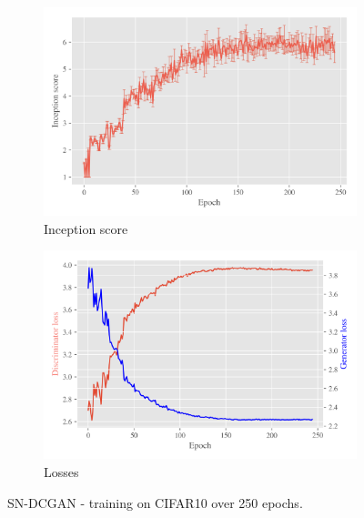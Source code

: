 \begin{figure}[H]
    \centering
    \begin{subfigure}[t]{0.49\textwidth}
        \centering
		\includegraphics[width=\textwidth]{../code/results/figures/sndcgan_cifar10_is.png}
		\caption{Inception score}
		\label{fig:exp-sndcgan-is}
    \end{subfigure}
    \begin{subfigure}[t]{0.49\textwidth}
        \centering
        \includegraphics[width=\textwidth]{../code/results/figures/sndcgan_cifar10_losses.png}
		\caption{Losses}
		\label{fig:exp-sndcgan-losses}
    \end{subfigure}
    \caption{SN-DCGAN - training on CIFAR10 over 250 epochs.}
\end{figure}
